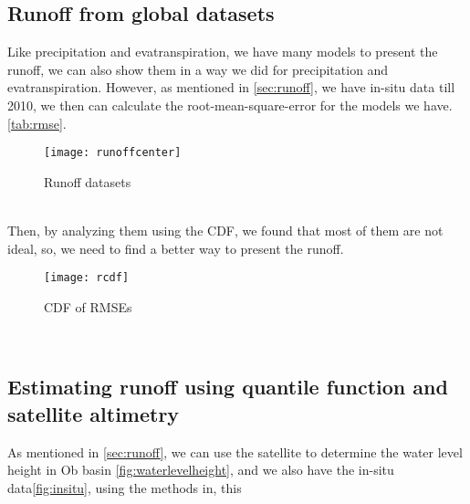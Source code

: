 \subsection{Runoff from global datasets}
Like precipitation and evatranspiration, we have many models to present the runoff, we can also show them in a way we did for precipitation and evatranspiration. However, as mentioned in \ref{sec:runoff}, we have in-situ data till 2010, we then can calculate the root-mean-square-error for the models we have. \ref{tab:rmse}.
\begin{figure}[htbp]
	\centering
	\texttt{[image: runoffcenter]} %
	\caption{Runoff datasets} 
	\label{fig:rcenter}
\end{figure}
\\
Then, by analyzing them using the CDF, we found that most of them are not ideal, so, we need to find a better way to present the runoff.
\begin{figure}[htbp]
	\centering
	\texttt{[image: rcdf]} %
	\caption{CDF of RMSEs} 
	\label{fig:rcdf}
\end{figure}\\
\subsection{Estimating runoff using quantile function and satellite altimetry}
 As mentioned in \ref{sec:runoff}, we can use the satellite to determine the water level height in Ob basin \ref{fig:waterlevelheight}, and we also have the in-situ data\ref{fig:insitu}, using the methods in, this 